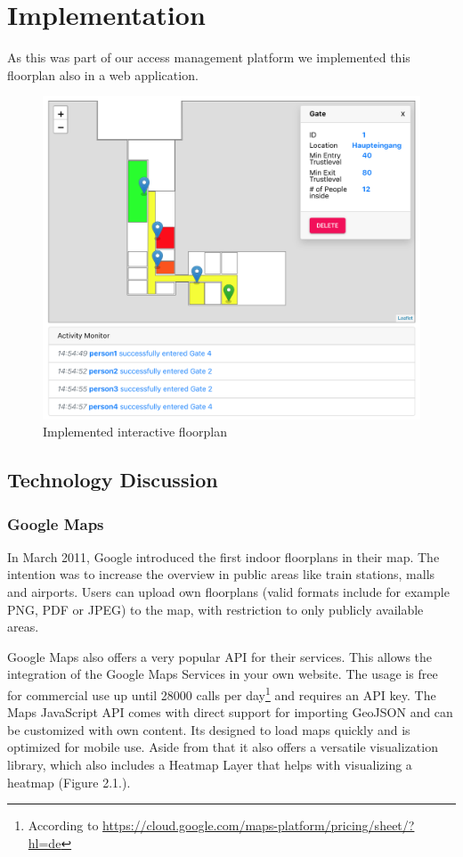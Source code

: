 \section{Implementation}
As this was part of our access management platform we implemented this floorplan also in a web application.

\begin{figure}[!hb]
	\centering
	\includegraphics[width=0.9\linewidth]{images/FloorplanScreenshot}
	\caption{Implemented interactive floorplan}
	\label{fig:FloorplanScreenshot}
\end{figure}

\subsection{Technology Discussion}

\subsubsection{Google Maps}
\label{Google Maps}

In March 2011, Google introduced the first indoor floorplans in their map. The intention was to increase the overview in public areas like train stations, malls and airports.
Users can upload own floorplans (valid formats include for example PNG, PDF or JPEG) to the map, with restriction to only publicly available areas.

Google Maps also offers a very popular API for their services. This allows the integration of the Google Maps Services in your own website. The usage is free for commercial use up until 28000 calls per day\footnote{According to \url{https://cloud.google.com/maps-platform/pricing/sheet/?hl=de}} and requires an API key.
The Maps JavaScript API comes with direct support for importing GeoJSON and can be customized with own content. Its designed to load maps quickly and is optimized for mobile use. Aside from that it also offers a versatile visualization library, which also includes a Heatmap Layer that helps with visualizing a heatmap (Figure 2.1.).

